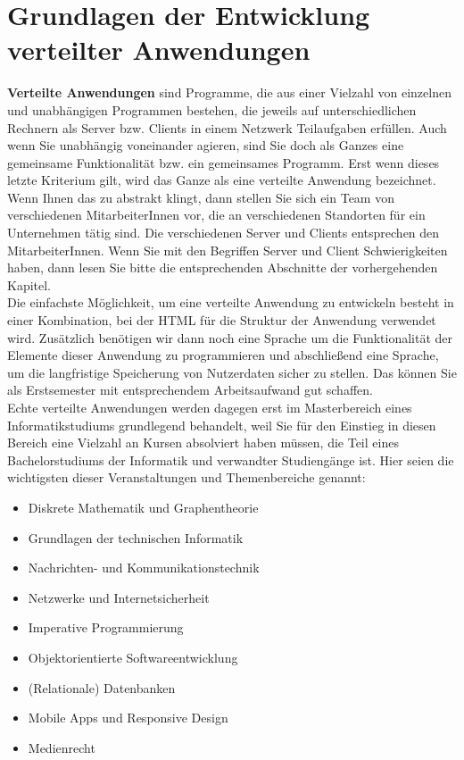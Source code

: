 \chapter[Grundlagen verteilter Anwendungen]{Grundlagen der Entwicklung verteilter Anwendungen}

\textbf{Verteilte Anwendungen} sind Programme, die aus einer Vielzahl von einzelnen und unabhängigen Programmen bestehen, die jeweils auf unterschiedlichen Rechnern als Server bzw. Clients in einem Netzwerk Teilaufgaben erfüllen. Auch wenn Sie unabhängig voneinander agieren, sind Sie doch als Ganzes eine gemeinsame Funktionalität bzw. ein gemeinsames Programm. Erst wenn dieses letzte Kriterium gilt, wird das Ganze als eine verteilte Anwendung bezeichnet.\\

Wenn Ihnen das zu abstrakt klingt, dann stellen Sie sich ein Team von verschiedenen MitarbeiterInnen vor, die an verschiedenen Standorten für ein Unternehmen tätig sind. Die verschiedenen Server und Clients entsprechen den MitarbeiterInnen. Wenn Sie mit den Begriffen Server und Client Schwierigkeiten haben, dann lesen Sie bitte die entsprechenden Abschnitte der vorhergehenden Kapitel.\\

Die einfachste Möglichkeit, um eine verteilte Anwendung zu entwickeln besteht in einer Kombination, bei der HTML für die Struktur der Anwendung verwendet wird. Zusätzlich benötigen wir dann noch eine Sprache um die Funktionalität der Elemente dieser Anwendung zu programmieren und abschließend eine Sprache, um die langfristige Speicherung von Nutzerdaten sicher zu stellen. Das können Sie als Erstsemester mit entsprechendem Arbeitsaufwand gut schaffen.\\

\glqq{}Echte\grqq{} verteilte Anwendungen werden dagegen erst im Masterbereich eines Informatikstudiums grundlegend behandelt, weil Sie für den Einstieg in diesen Bereich eine Vielzahl an Kursen absolviert haben müssen, die Teil eines Bachelorstudiums der Informatik und verwandter Studiengänge ist. Hier seien die wichtigsten dieser Veranstaltungen und Themenbereiche genannt:

\begin{itemize}
	\item Diskrete Mathematik und Graphentheorie
	\item Grundlagen der technischen Informatik
	\item Nachrichten- und Kommunikationstechnik
	\item Netzwerke und Internetsicherheit
	\item Imperative Programmierung
	\item Objektorientierte Softwareentwicklung
	\item (Relationale) Datenbanken
	\item Mobile Apps und Responsive Design
	\item Medienrecht
\end{itemize}

